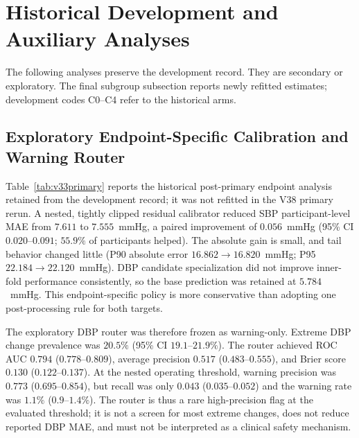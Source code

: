 \documentclass[journal]{IEEEtran}
\begin{document}
\section{Historical Development and Auxiliary Analyses}
The following analyses preserve the development record. They are secondary or exploratory. The final subgroup subsection reports newly refitted estimates; development codes C0--C4 refer to the historical arms.
\subsection{Exploratory Endpoint-Specific Calibration and Warning Router}
\label{sec:v34}
Table~\ref{tab:v33primary} reports the historical post-primary endpoint analysis retained from the development record; it was not refitted in the V38 primary rerun. A nested, tightly clipped residual calibrator reduced SBP participant-level MAE from $7.611$ to $7.555$~mmHg, a paired improvement of $0.056$~mmHg (95\% CI $0.020$--$0.091$; $55.9\%$ of participants helped). The absolute gain is small, and tail behavior changed little (P90 absolute error $16.862 \to 16.820$~mmHg; P95 $22.184 \to 22.120$~mmHg). DBP candidate specialization did not improve inner-fold performance consistently, so the base prediction was retained at $5.784$~mmHg. This endpoint-specific policy is more conservative than adopting one post-processing rule for both targets.
\begin{table}[t]
\centering
\caption{Exploratory Endpoint-Specific Nested Analysis (653 Participants)}
\label{tab:v33primary}
\scriptsize
{}
\end{table}
The exploratory DBP router was therefore frozen as warning-only. Extreme DBP change prevalence was $20.5\%$ (95\% CI $19.1$--$21.9\%$). The router achieved ROC AUC $0.794$ ($0.778$--$0.809$), average precision $0.517$ ($0.483$--$0.555$), and Brier score $0.130$ ($0.122$--$0.137$). At the nested operating threshold, warning precision was $0.773$ ($0.695$--$0.854$), but recall was only $0.043$ ($0.035$--$0.052$) and the warning rate was $1.1\%$ ($0.9$--$1.4\%$). The router is thus a rare high-precision flag at the evaluated threshold; it is not a screen for most extreme changes, does not reduce reported DBP MAE, and must not be interpreted as a clinical safety mechanism.
\end{document}
